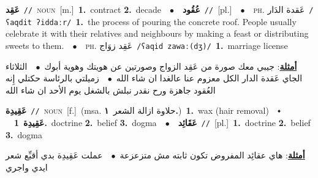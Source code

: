 \documentclass[10pt,a4paper,twoside]{article} %
\begin{document}
\begin{multicols}{2}
{\setlength\topsep{0pt}\textbf{\foreignlanguage{arabic}{عَقِد}}\ {\color{gray}\texttt{//}\color{black}}\ \textsc{noun}\ [m.]\ \textbf{1.}~contract  \textbf{2.}~decade\ \ $\bullet$\ \ \setlength\topsep{0pt}\textbf{\foreignlanguage{arabic}{عُقُود}}\ {\color{gray}\texttt{//}\color{black}}\ [pl.]\ \ $\bullet$\ \ \textsc{ph.} \color{gray} \foreignlanguage{arabic}{عَقدة الدَار}\color{black}\ {\color{gray}\texttt{/{\sffamily ʕaqdit ʔiddaːr}/}\color{black}}\ \textbf{1.}~the process of pouring the concrete roof. People usually celebrate it with their relatives and neighbours by making a feast or distributing sweets to them.\ \ $\bullet$\ \ \textsc{ph.} \color{gray} \foreignlanguage{arabic}{عَقِد زوَاج}\color{black}\ {\color{gray}\texttt{/{\sffamily ʕaqid zawaː(dʒ)}/}\color{black}}\ \textbf{1.}~marriage license\  \begin{flushright}\color{gray}\foreignlanguage{arabic}{\textbf{\underline{\foreignlanguage{arabic}{أمثلة}}}: جيبي معك صورة من عَقِد الزواج وصورتين عن هويتك وهوية أبوك\ $\bullet$\ \  الثلاثاء الجاي عَقدة الدار الكل معزوم عنا عالغدا ان شاء الله\ $\bullet$\ \  زميلتي بالرئاسة حكتلي إِنه العُقود جاهزة ورح نقدر نبلش بالشغل يوم الأحد ان شاء الله}\end{flushright}\color{black}} \vspace{2mm}

{\setlength\topsep{0pt}\textbf{\foreignlanguage{arabic}{عَقِيدِة}}\ {\color{gray}\texttt{//}\color{black}}\ \textsc{noun}\ [f.]\ \color{gray}(msa. \foreignlanguage{arabic}{حلاوة ازالة الشعر}~\foreignlanguage{arabic}{\textbf{١.}})\color{black}\ \textbf{1.}~wax (hair removal)\ \ $\smblkdiamond$\ \ \setlength\topsep{0pt}\textbf{\foreignlanguage{arabic}{عَقِيدِة}}\ \textbf{1.}~doctrine  \textbf{2.}~belief  \textbf{3.}~dogma\ \ $\bullet$\ \ \setlength\topsep{0pt}\textbf{\foreignlanguage{arabic}{عَقَائِد}}\ {\color{gray}\texttt{//}\color{black}}\ [pl.]\ \textbf{1.}~doctrine  \textbf{2.}~belief  \textbf{3.}~dogma\  \begin{flushright}\color{gray}\foreignlanguage{arabic}{\textbf{\underline{\foreignlanguage{arabic}{أمثلة}}}: هاي عقائِد المفروض تكون ثابته مش متزعزعة\ $\bullet$\ \  عملت عَقِيدِة بدي أقبِّع شعر ايدي واجري}\end{flushright}\color{black}} \vspace{2mm}


\end{multicols}
\end{document}
